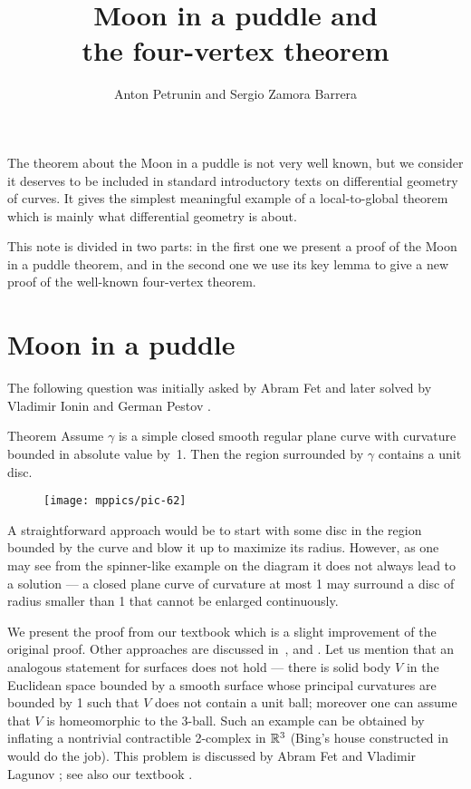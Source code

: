 \documentclass{article}
\begin{document}

\title{Moon in a puddle and\\ the four-vertex theorem}
\author{Anton Petrunin and Sergio Zamora Barrera}
\date{}
\maketitle

The theorem about the Moon in a puddle is not very well known, but we consider it deserves to be included in standard introductory texts on differential geometry of curves.
It gives the simplest meaningful example of a local-to-global theorem which is mainly what differential geometry is about.

This note is divided in two parts: in the first one we present a proof of the Moon in a puddle theorem, and in the second one we use its key lemma to give a new proof of the well-known four-vertex theorem. 


\section*{Moon in a puddle}

The following question was initially asked by Abram Fet and later solved by Vladimir Ionin and German Pestov \cite{pestov-ionin}.

\begin{thm}{Theorem}\label{thm:moon-orginal}
Assume $\gamma$ is a simple closed smooth regular plane curve with curvature bounded in absolute value by~1.
Then the region surrounded by $\gamma$ contains a unit disc.
\end{thm}


{

\begin{wrapfigure}{r}{33 mm}
\vskip-6mm
\centering
\texttt{[image: mppics/pic-62]}
\vskip0mm
\end{wrapfigure}

A straightforward approach would be to start with some disc in the region bounded by the curve and blow it up to maximize its radius.
However, as one may see from the spinner-like example on the diagram it does not always lead to a solution --- a closed plane curve of curvature at most 1 may surround a disc of radius smaller than 1 that cannot be enlarged continuously.

}

We present the proof from our textbook \cite{petrunin-zamora} which is a slight improvement of the original proof.
Other approaches are discussed in~\cite{petrunin-2020,panov-petrunin,pankrashkin}, and \cite[Problem 1.7.19]{toponogov}.
Let us mention that an analogous statement for surfaces does not hold --- there is solid body $V$ in the Euclidean space bounded by a smooth surface whose principal curvatures are bounded by 1 such that $V$ does not contain a unit ball; moreover one can assume that $V$ is homeomorphic to the 3-ball.
Such an example can be obtained by inflating a nontrivial contractible 2-complex in $\mathbb{R}^3$ 
(Bing's house constructed in \cite{bing} would do the job).
This problem is discussed by Abram Fet and Vladimir Lagunov \cite{lagunov-2,lagunov-fet}; see also our textbook \cite{petrunin-zamora}.
\end{document}
